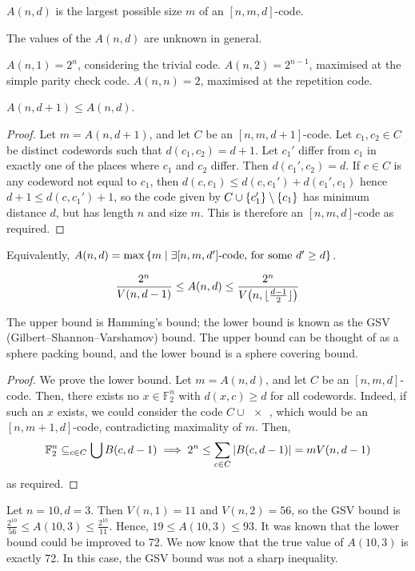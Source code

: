 \begin{definition}
    \( A(n,d) \) is the largest possible size \( m \) of an \( [n,m,d] \)-code.
\end{definition}
The values of the \( A(n,d) \) are unknown in general.
\begin{example}
    \( A(n,1) = 2^n \), considering the trivial code.
    \( A(n,2) = 2^{n-1} \), maximised at the simple parity check code.
    \( A(n,n) = 2 \), maximised at the repetition code.
\end{example}
\begin{lemma}
    \( A(n,d+1) \leq A(n,d) \).
\end{lemma}
\begin{proof}
    Let \( m = A(n,d+1) \), and let \( C \) be an \( [n,m,d+1] \)-code.
    Let \( c_1, c_2 \in C \) be distinct codewords such that \( d(c_1,c_2) = d+1 \).
    Let \( c_1' \) differ from \( c_1 \) in exactly one of the places where \( c_1 \) and \( c_2 \) differ.
    Then \( d(c_1', c_2) = d \).
    If \( c \in C \) is any codeword not equal to \( c_1 \), then \( d(c,c_1) \leq d(c,c_1') + d(c_1',c_1) \) hence \( d + 1 \leq d(c,c_1') + 1 \), so the code given by \( C \cup \qty{c_1'} \setminus \qty{c_1} \) has minimum distance \( d \), but has length \( n \) and size \( m \).
    This is therefore an \( [n,m,d] \)-code as required.
\end{proof}
\begin{corollary}
    Equivalently, \( A(n,d) = \max \qty{m \mid \exists [n,m,d'] \text{-code, for some } d' \geq d} \).
\end{corollary}
\begin{theorem}
    \[ \frac{2^n}{V(n,d-1)} \leq A(n,d) \leq \frac{2^n}{V\qty(n,\lfloor\frac{d-1}{2}\rfloor)} \]
\end{theorem}
The upper bound is Hamming's bound; the lower bound is known as the GSV (Gilbert--Shannon--Varshamov) bound.
The upper bound can be thought of as a sphere packing bound, and the lower bound is a sphere covering bound.
\begin{proof}
    We prove the lower bound.
    Let \( m = A(n,d) \), and let \( C \) be an \( [n,m,d] \)-code.
    Then, there exists no \( x \in \mathbb F_2^n \) with \( d(x,c) \geq d \) for all codewords.
    Indeed, if such an \( x \) exists, we could consider the code \( C \cup \qty{x} \), which would be an \( [n,m+1,d] \)-code, contradicting maximality of \( m \).
    Then,
    \[ \mathbb F_2^n \subseteq_{c \in C} \bigcup B(c,d-1) \implies 2^n \leq \sum_{c \in C} \abs{B(c,d-1)} = mV(n,d-1) \]
    as required.
\end{proof}
\begin{example}
    Let \( n = 10, d = 3 \).
    Then \( V(n,1) = 11 \) and \( V(n,2) = 56 \), so the GSV bound is \( \frac{2^{10}}{56} \leq A(10,3) \leq \frac{2^{10}}{11} \).
    Hence, \( 19 \leq A(10,3) \leq 93 \).
    It was known that the lower bound could be improved to 72.
    We now know that the true value of \( A(10,3) \) is exactly 72.
    In this case, the GSV bound was not a sharp inequality.
\end{example}

